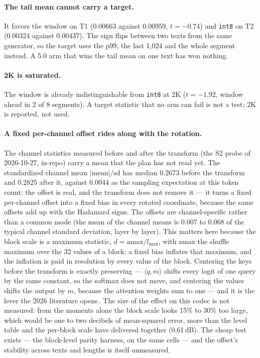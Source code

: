 \documentclass[10pt,twocolumn]{article}
\begin{document}
\paragraph{The tail mean cannot carry a target.} It favors the window on T1 (0.00663 against 0.00959, $t{=}-0.74$) and \texttt{int8} on T2 (0.00324 against 0.00437). The sign flips between two texts from the same generator, so the target uses the p99, the last 1,024 and the whole segment instead. A 5.0 arm that wins the tail mean on one text has won nothing.

\paragraph{2K is saturated.} The window is already indistinguishable from \texttt{int8} at 2K ($t{=}-1.92$, window ahead in 2 of 8 segments). A target statistic that no arm can fail is not a test; 2K is reported, not used.

\paragraph{A fixed per-channel offset rides along with the rotation.} The channel statistics measured before and after the transform (the S2 probe of 2026-10-27, in-repo) carry a mean that the plan has not read yet. The standardized channel mean $|\mathrm{mean}|/\mathrm{sd}$ has median 0.2673 before the transform and 0.2825 after it, against 0.0044 as the sampling expectation at this token count: the offset is real, and the transform does not remove it --- it turns a fixed per-channel offset into a fixed bias in every rotated coordinate, because the same offsets add up with the Hadamard signs. The offsets are channel-specific rather than a common mode (the mean of the channel means is 0.007 to 0.068 of the typical channel standard deviation, layer by layer). This matters here because the block scale is a maximum statistic, $d = \mathrm{amax}/l_{\max}$, with $\mathrm{amax}$ the shuffle maximum over the 32 values of a block: a fixed bias inflates that maximum, and the inflation is paid in resolution by every value of the block. Centering the keys before the transform is exactly preserving --- $\langle q, m\rangle$ shifts every logit of one query by the same constant, so the softmax does not move, and centering the values shifts the output by $m$, because the attention weights sum to one --- and it is the lever the 2026 literature opens\,\cite{optr}. The size of the effect on this codec is not measured: from the moments alone the block scale looks 15\% to 30\% too large, which would be one to two decibels of mean-squared error, more than the level table and the per-block scale have delivered together (0.61\,dB). The cheap test exists --- the block-level parity harness, on the same cells --- and the offset's stability across texts and lengths is itself unmeasured.
\end{document}

